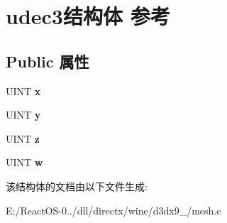 \hypertarget{structudec3}{}\section{udec3结构体 参考}
\label{structudec3}
\subsection*{Public 属性}
\begin{DoxyCompactItemize}
\item 
\mbox{\label{structudec3_a5cb9f3e2cff73030410be479a5098c68}} 
U\+I\+NT {\bfseries x}
\item 
\mbox{\label{structudec3_a8dfb075537ad0f96ac1cde66e4887e73}} 
U\+I\+NT {\bfseries y}
\item 
\mbox{\label{structudec3_ab34113b7debfbb5d97542c4922fa1f2c}} 
U\+I\+NT {\bfseries z}
\item 
\mbox{\label{structudec3_a4835f0198a307c2d553a0dc23893bff5}} 
U\+I\+NT {\bfseries w}
\end{DoxyCompactItemize}


该结构体的文档由以下文件生成\+:\begin{DoxyCompactItemize}
\item 
E\+:/\+React\+O\+S-\/0../dll/directx/wine/d3dx9\+\_/mesh.\+c\end{DoxyCompactItemize}
